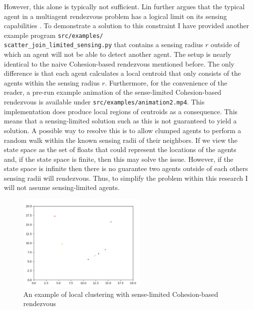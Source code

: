 \documentclass[journal,a4paper,12pt]{IEEEtran}
\begin{document}
However, this alone is typically not sufficient. Lin further argues that the typical
agent in a multiagent rendezvous problem has a logical limit on its sensing
capabilities \cite{lin_multi}. To demonstrate a solution to this constraint I have
provided another example program \texttt{src/examples/\\scatter\_join\_limited\_sensing.py}
that contains a sensing radius $r$ outside of which an agent will not be able to detect
another agent. The setup is nearly identical to the naive Cohesion-based rendezvous
mentioned before. The only difference is that each agent calculates a local centroid
that only consists of the agents within the sensing radius $r$. Furthermore, for the
convenience of the reader, a pre-run example animation of the sense-limited Cohesion-based
rendezvous is available under \texttt{src/examples/animation2.mp4}. This implementation does
produce local regions of centroids as a consequence. This means that a sensing-limited
solution such as this is not guaranteed to yield a solution. A possible way to resolve
this is to allow clumped agents to perform a random walk within the known sensing
radii of their neighbors. If we view the state space as the set of floats that could
represent the locations of the agents and, if the state space is finite, then this may solve
the issue. However, if the state space is infinite then there is no guarantee two
agents outside of each others sensing radii will rendezvous. Thus, to simplify the
problem within this research I will not assume sensing-limited agents.

\begin{figure}[h!]
  \centering
  \includegraphics[width=2.5in]{img/yeetset1}
  \caption{An example of local clustering with sense-limited Cohesion-based rendezvous}
  \label{yeet_set1}
\end{figure}


\end{document}

